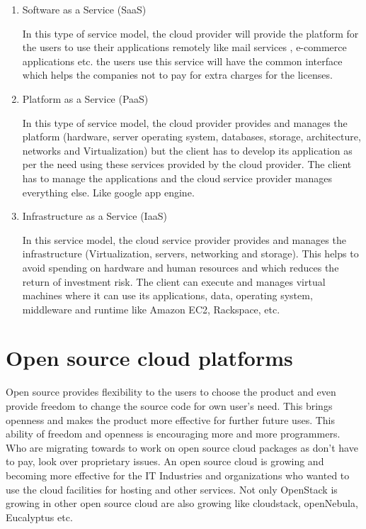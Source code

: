     \par
    \begin{enumerate}
        \item Software as a Service (SaaS)
        \par
            In this type of service model, the cloud provider will provide the platform for the users to use their applications remotely like mail services , e-commerce applications etc. the users use this service will have the common interface which helps the companies not to pay for extra charges for the licenses\cite{deploy}.%
        
        \item Platform as a Service (PaaS)
        \par
            In this type of service model, the cloud provider provides and manages the platform (hardware, server operating system, databases, storage, architecture, networks and Virtualization) but the client has to develop its application as per the need using these services provided by the cloud provider. The client has to manage the applications and the cloud service provider manages everything else. Like google app engine\cite{deploy}.%
        
        \item Infrastructure as a Service (IaaS)
        \par
            In this service model, the cloud service provider provides and manages the infrastructure (Virtualization, servers, networking and storage). This helps to avoid spending on hardware and human resources and which reduces the return of investment risk. The client can execute and manages virtual machines where it can use its applications, data, operating system, middleware and runtime like Amazon EC2, Rackspace, etc\cite{deploy}.
    \end{enumerate}
    
    \section{Open source cloud platforms}
    
    Open source provides flexibility to the users to choose the product and even provide freedom to change the source code for own user's need. This brings openness and makes the product more effective for further future uses. This ability of freedom and openness is encouraging more and more programmers. Who are migrating towards to work on open source cloud packages as don't have to pay, look over proprietary issues. An open source cloud is growing and becoming more effective for the IT Industries and organizations who wanted to use the cloud facilities for hosting and other services. Not only OpenStack is growing in other open source cloud are also growing like cloudstack, openNebula, Eucalyptus etc.
    
